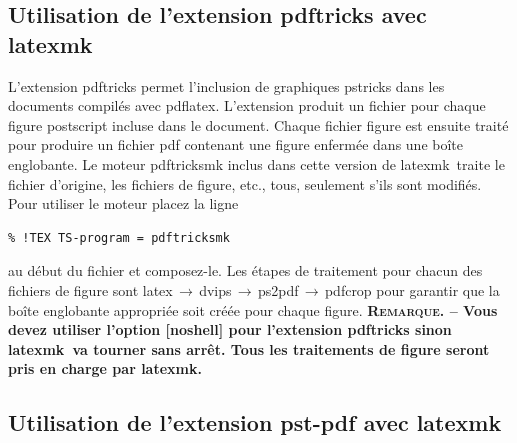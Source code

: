 \documentclass[11pt,french]{article}
\newcommand{\latexmk}{\textsf{latexmk}}
\newcommand{\cmd}[1]{\textsf{#1}}
\newcommand{\To}{\,\(\to\)\,}
\begin{document}
\subsection{Utilisation de l'extension \cmd{pdftricks} avec \latexmk}

L'extension \cmd{pdftricks} permet l'inclusion de graphiques \cmd{pstricks} dans les documents compilés avec \cmd{pdflatex}. L'extension produit un fichier pour chaque figure postscript incluse dans le document. Chaque fichier figure est ensuite traité pour produire un fichier \cmd{pdf} contenant une figure enfermée dans une boîte englobante. Le moteur \cmd{pdftricksmk} inclus dans cette version de \latexmk\ traite le fichier d'origine, les fichiers de figure, etc., tous, seulement s'ils sont modifiés. Pour utiliser le moteur placez la ligne
\begin{verbatim}
% !TEX TS-program = pdftricksmk
\end{verbatim}
au début du fichier et composez-le. Les étapes de traitement pour chacun des fichiers de figure sont \cmd{latex}\To\cmd{dvips}\To\cmd{ps2pdf}\To\cmd{pdfcrop} pour garantir que la boîte englobante appropriée soit créée pour chaque figure. \textbf{\textsc{Remarque}. -- Vous devez utiliser l'option [\cmd{noshell}] pour l'extension \cmd{pdftricks} sinon \latexmk\ va tourner sans arrêt. Tous les traitements de figure seront pris en charge par \latexmk.}

%


\subsection{Utilisation de l'extension \cmd{pst-pdf} avec \latexmk}
\end{document}
